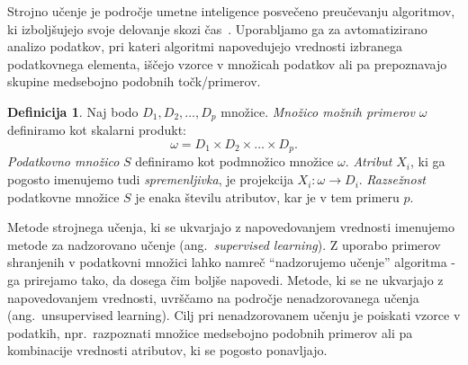 \documentclass[12pt,a4paper,twoside]{article}
\theoremstyle{definition} %
\newtheorem{definicija}{Definicija}[section]
\theoremstyle{plain} %
\numberwithin{equation}{section}  %
\begin{document}

Strojno učenje je področje umetne inteligence posvečeno preučevanju algoritmov, 
ki izboljšujejo svoje delovanje skozi čas~\cite{hastie2009elements}. %
Uporabljamo ga za avtomatizirano analizo podatkov, pri kateri algoritmi napovedujejo vrednosti izbranega podatkovnega elementa,
iščejo vzorce v množicah podatkov ali pa prepoznavajo skupine medsebojno podobnih točk/primerov. 

\begin{definicija}
	Naj bodo $D_1, D_2, \ldots, D_p$ množice.
	\emph{Množico možnih primerov} $\omega$ definiramo kot skalarni produkt:
	\[
		\omega = D_1 \times D_2 \times \dots \times D_p.
	\]
	\emph{Podatkovno množico} $S$ definiramo kot podmnožico množice $\omega$.
	\emph{Atribut} $X_i$, ki ga pogosto imenujemo tudi \emph{spremenljivka}, je projekcija $X_i : \omega \rightarrow D_i$.
	\emph{Razsežnost} podatkovne množice $S$ je enaka številu atributov, kar je v tem primeru $p$.
\end{definicija}

Metode strojnega učenja, ki se ukvarjajo z napovedovanjem vrednosti imenujemo metode za nadzorovano učenje (ang.~\emph{supervised learning}). 
Z uporabo primerov shranjenih v podatkovni množici lahko namreč ``nadzorujemo učenje'' algoritma - ga prirejamo tako, da dosega čim boljše napovedi.
Metode, ki se ne ukvarjajo z napovedovanjem vrednosti, uvrščamo na področje nenadzorovanega učenja (ang.~unsupervised learning).
Cilj pri nenadzorovanem učenju je poiskati vzorce v podatkih, npr.\ razpoznati množice medsebojno podobnih primerov ali pa kombinacije vrednosti atributov, ki se pogosto ponavljajo.
\end{document}
